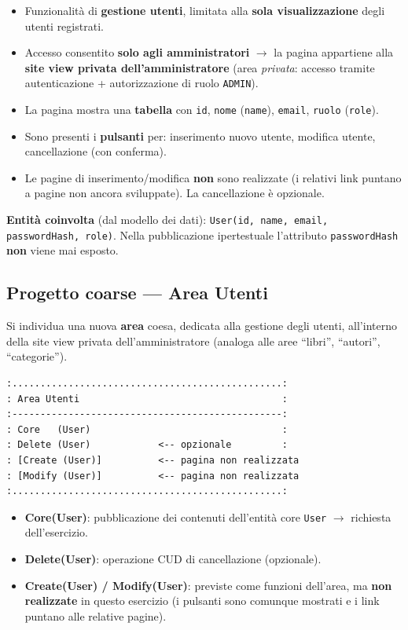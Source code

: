 \documentclass[11pt,a4paper]{article}
\newcommand{\code}[1]{\texttt{\small #1}}
\begin{document}
\begin{itemize}[leftmargin=1.4em]
  \item Funzionalità di \textbf{gestione utenti}, limitata alla \textbf{sola
        visualizzazione} degli utenti registrati.
  \item Accesso consentito \textbf{solo agli amministratori} $\rightarrow$ la
        pagina appartiene alla \textbf{site view privata dell'amministratore}
        (area \emph{privata}: accesso tramite autenticazione + autorizzazione di
        ruolo \code{ADMIN}).
  \item La pagina mostra una \textbf{tabella} con \code{id}, \code{nome}
        (\code{name}), \code{email}, \code{ruolo} (\code{role}).
  \item Sono presenti i \textbf{pulsanti} per: inserimento nuovo utente, modifica
        utente, cancellazione (con conferma).
  \item Le pagine di inserimento/modifica \textbf{non} sono realizzate (i relativi
        link puntano a pagine non ancora sviluppate). La cancellazione è opzionale.
\end{itemize}

\textbf{Entità coinvolta} (dal modello dei dati):
\code{User(id, name, email, passwordHash, role)}.
Nella pubblicazione ipertestuale l'attributo \code{passwordHash} \textbf{non}
viene mai esposto.

\subsection{Progetto coarse --- Area Utenti}

Si individua una nuova \textbf{area} coesa, dedicata alla gestione degli utenti,
all'interno della site view privata dell'amministratore (analoga alle aree
``libri'', ``autori'', ``categorie'').

\begin{lstlisting}[style=diagram]
:................................................:
: Area Utenti                                    :
:------------------------------------------------:
: Core   (User)                                  :
: Delete (User)            <-- opzionale         :
: [Create (User)]          <-- pagina non realizzata
: [Modify (User)]          <-- pagina non realizzata
:................................................:
\end{lstlisting}

\begin{itemize}[leftmargin=1.4em]
  \item \textbf{Core(User)}: pubblicazione dei contenuti dell'entità core
        \code{User} $\rightarrow$ richiesta dell'esercizio.
  \item \textbf{Delete(User)}: operazione CUD di cancellazione (opzionale).
  \item \textbf{Create(User) / Modify(User)}: previste come funzioni dell'area, ma
        \textbf{non realizzate} in questo esercizio (i pulsanti sono comunque
        mostrati e i link puntano alle relative pagine).
\end{itemize}
\end{document}
